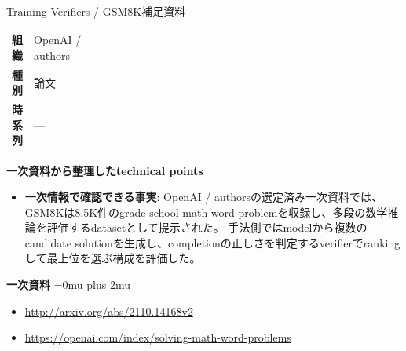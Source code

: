 \begin{technicalnote}{Training Verifiers / GSM8K}{補足資料}
\begingroup
\begin{tabularx}{\linewidth}{@{}>{\bfseries}p{0.22\linewidth}X@{}}
組織 & OpenAI / authors \\
種別 & 論文 \\
時系列 & — \\
\end{tabularx}
\smallskip
{\bfseries 一次資料から整理したtechnical points}
\begin{itemize}[leftmargin=1.5em,itemsep=0.35em]
\item \textbf{一次情報で確認できる事実}: OpenAI / authorsの選定済み一次資料では、GSM8Kは8.5K件のgrade-school math word problemを収録し、多段の数学推論を評価するdatasetとして提示された。 手法側ではmodelから複数のcandidate solutionを生成し、completionの正しさを判定するverifierでrankingして最上位を選ぶ構成を評価した。
\end{itemize}
\begin{minipage}{\linewidth}
\begin{samepage}
{\bfseries 一次資料}
\begingroup\sloppy
\Urlmuskip=0mu plus 2mu\relax
\begin{itemize}[leftmargin=1.5em,itemsep=0.25em]
\item {\scriptsize\url{http://arxiv.org/abs/2110.14168v2}}
\item {\scriptsize\url{https://openai.com/index/solving-math-word-problems}}
\end{itemize}
\endgroup
\end{samepage}
\end{minipage}
\endgroup
\end{technicalnote}
\medskip
